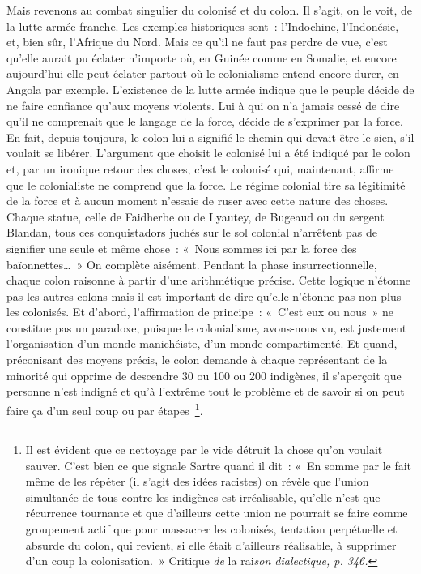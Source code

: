 \documentclass[french,twoside]{book} %
\begin{document}
Mais revenons au combat singulier du colonisé et du colon. Il s’agit, on le voit, de la lutte armée franche. Les exemples historiques sont : l’Indochine, l’Indonésie, et, bien sûr, l’Afrique du Nord. Mais ce qu’il ne faut pas perdre de vue, c’est qu’elle aurait pu éclater n’importe où, en Guinée comme en Somalie, et encore aujourd’hui elle peut éclater partout où le colonialisme entend encore durer, en Angola par exemple. L’existence de la lutte armée indique que le peuple décide de ne faire confiance qu’aux moyens violents. Lui à qui on n’a jamais cessé de dire qu’il ne comprenait que le langage de la force, décide de s’exprimer par la force. En fait, depuis toujours, le colon lui a signifié le chemin qui devait être le sien, s’il voulait se libérer. L’argument que choisit le colonisé lui a été indiqué par le colon et, par un ironique retour des choses, c’est le colonisé qui, maintenant, affirme que le colonialiste ne comprend que la force. Le régime colonial tire sa légitimité de la force et à aucun moment n’essaie de ruser avec cette nature des choses. Chaque statue, celle de Faidherbe ou de Lyautey, de Bugeaud ou du sergent Blandan, tous ces conquistadors juchés sur le sol colonial n’arrêtent pas de signifier une seule et même chose : « Nous sommes ici par la force des baïonnettes… » On complète aisément. Pendant la phase insurrectionnelle, chaque colon raisonne à partir d’une arithmétique précise. Cette logique n’étonne pas les autres colons mais il est important de dire qu’elle n’étonne pas non plus les colonisés. Et d’abord, l’affirmation de principe : « C’est eux ou nous » ne constitue pas un paradoxe, puisque le colonialisme, avons-nous vu, est justement l’organisation d’un monde manichéiste, d’un monde compartimenté. Et quand, préconisant des moyens précis, le colon demande à chaque représentant de la minorité qui opprime de descendre 30 ou 100 ou 200 indigènes, il s’aperçoit que personne n’est indigné et qu’à   l’extrême tout le problème et de savoir si on peut faire ça d’un seul coup ou par étapes \footnote{Il est évident que ce nettoyage par le vide détruit la chose qu’on voulait sauver. C’est bien ce que signale Sartre quand il dit : « En somme par le fait même de les répéter (il s’agit des idées racistes) on révèle que l’union simultanée de tous contre les indigènes est irréalisable, qu’elle n’est que récurrence tournante et que d’ailleurs cette union ne pourrait se faire comme groupement actif que pour massacrer les colonisés, tentation perpétuelle et absurde du colon, qui revient, si elle était d’ailleurs réalisable, à supprimer d’un coup la colonisation. » Critique \emph{de} la rai\emph{son dialectique, p. 346.}}.\par
\end{document}
